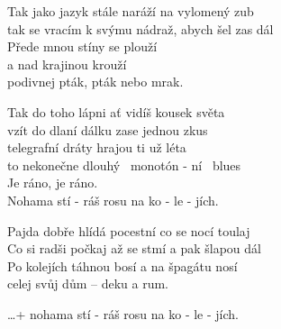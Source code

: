 
\ve{}
Tak jako jazyk stále naráží na vylomený zub\\
tak se vracím k svýmu nádraž, abych šel zas dál\\
Přede mnou stíny se plouží\\
a nad krajinou krouží\\
podivnej pták, \quad {}pták nebo mrak.

\cho{}
Tak do toho lápni ať vidíš kousek světa\\
vzít do dlaní dálku zase jednou zkus\\
telegrafní dráty hrajou ti už léta\\
to nekonečne dlouhý \ monotón - ní \ blues\\
Je ráno, je ráno.\\
Nohama stí - ráš rosu na ko - le - jích.

\ve{}
Pajda dobře hlídá pocestní co se nocí toulaj\\
Co si radši počkaj až se stmí a pak šlapou dál\\
Po kolejích táhnou bosí a na špagátu nosí\\
celej svůj dům -- deku a rum.

\cho{}
\ldots + nohama stí - ráš rosu na ko - le - jích.

\esong